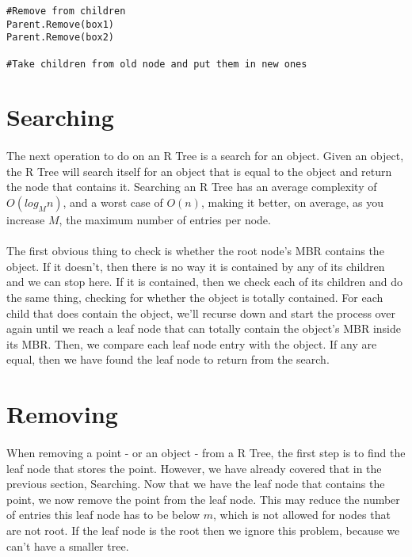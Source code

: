 \documentclass{article}
\begin{document}
\begin{multicols}{2}[]
\begin{lstlisting}
#Remove from children
Parent.Remove(box1)
Parent.Remove(box2)

#Take children from old node and put them in new ones
\end{lstlisting}

\section{Searching}

\paragraph{}
The next operation to do on an R Tree is a search for an object. Given an object, the R Tree will search itself for
an object that is equal to the object and return the node that contains it. Searching an R Tree has an average complexity
of $O(log_Mn)$, and a worst case of $O(n)$, making it better, on average, as you increase $M$, the maximum number of entries
per node.

\paragraph{}The first obvious thing to check is whether the root
node's MBR contains the object. If it doesn't, then there is no way it is contained by any of its children and we can stop here.
If it is contained, then we check each of its children and do the same thing, checking for whether the object is totally contained.
For each child that does contain the object, we'll recurse down and start the process over again until we reach a leaf node that
can totally contain the object's MBR inside its MBR. Then, we compare each leaf node entry with the object. If any are equal, then
we have found the leaf node to return from the search.

\section{Removing}

\paragraph{}
When removing a point - or an object - from a R Tree, the first step is to find the leaf node that stores the point.
However, we have already covered that in the previous section, Searching. Now that we have the leaf node that contains
the point, we now remove the point from the leaf node. This may reduce the number of entries this leaf node has to be below
$m$, which is not allowed for nodes that are not root. If the leaf node is the root then we ignore this problem, because
we can't have a smaller tree.\\


\end{multicols}
\end{document}
